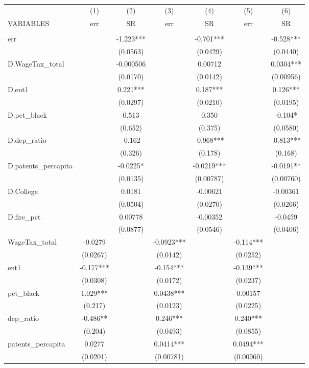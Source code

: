 \begin{tabular}{lcccccc} \hline
 & (1) & (2) & (3) & (4) & (5) & (6) \\
VARIABLES & err & SR & err & SR & err & SR \\ \hline
 &  &  &  &  &  &  \\
err &  & -1.223*** &  & -0.701*** &  & -0.528*** \\
 &  & (0.0563) &  & (0.0429) &  & (0.0440) \\
D.WageTax\_total &  & -0.000506 &  & 0.00712 &  & 0.0304*** \\
 &  & (0.0170) &  & (0.0142) &  & (0.00956) \\
D.ent1 &  & 0.221*** &  & 0.187*** &  & 0.126*** \\
 &  & (0.0297) &  & (0.0210) &  & (0.0195) \\
D.pct\_black &  & 0.513 &  & 0.350 &  & -0.104* \\
 &  & (0.652) &  & (0.375) &  & (0.0580) \\
D.dep\_ratio &  & -0.162 &  & -0.968*** &  & -0.813*** \\
 &  & (0.326) &  & (0.178) &  & (0.168) \\
D.patents\_percapita &  & -0.0225* &  & -0.0219*** &  & -0.0191** \\
 &  & (0.0135) &  & (0.00787) &  & (0.00760) \\
D.College &  & 0.0181 &  & -0.00621 &  & -0.00361 \\
 &  & (0.0504) &  & (0.0270) &  & (0.0266) \\
D.fire\_pct &  & 0.00778 &  & -0.00352 &  & -0.0459 \\
 &  & (0.0877) &  & (0.0546) &  & (0.0406) \\
WageTax\_total & -0.0279 &  & -0.0923*** &  & -0.114*** &  \\
 & (0.0267) &  & (0.0142) &  & (0.0252) &  \\
ent1 & -0.177*** &  & -0.154*** &  & -0.139*** &  \\
 & (0.0308) &  & (0.0172) &  & (0.0237) &  \\
pct\_black & 1.029*** &  & 0.0438*** &  & 0.00157 &  \\
 & (0.217) &  & (0.0123) &  & (0.0225) &  \\
dep\_ratio & -0.486** &  & 0.246*** &  & 0.240*** &  \\
 & (0.204) &  & (0.0493) &  & (0.0855) &  \\
patents\_percapita & 0.0277 &  & 0.0414*** &  & 0.0494*** &  \\
 & (0.0201) &  & (0.00781) &  & (0.00960) &  \\

\end{tabular}
